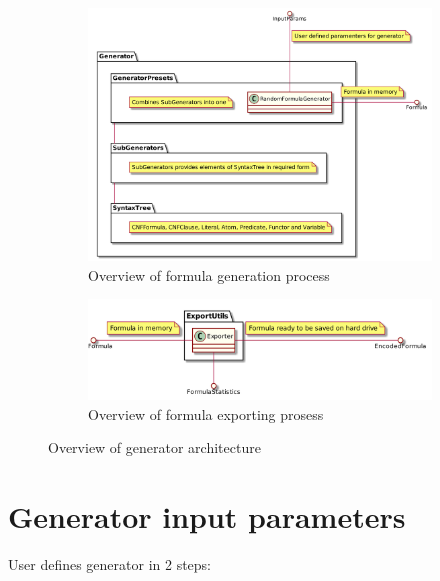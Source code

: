 \begin{figure}[H]
  \centering
  \begin{subfigure}[b]{0.8\textwidth}
    \centering
    \includegraphics[width=\textwidth]{logic-formula-generator/fol/cnf_generator_overview.png}
    \caption{Overview of formula generation process}
    \label{pic:GeneratorOverview}
  \end{subfigure}

  \begin{subfigure}[b]{0.7\textwidth}
    \centering
    \includegraphics[width=\textwidth]{logic-formula-generator/fol/export_overview.png}
    \caption{Overview of formula exporting prosess}
    \label{pic:ExportOverview}
  \end{subfigure}
  \caption{Overview of generator architecture}
  \label{pic:ExportAndGeneratorOverview}
\end{figure}


\section{Generator input parameters}

User defines generator in 2 steps:

